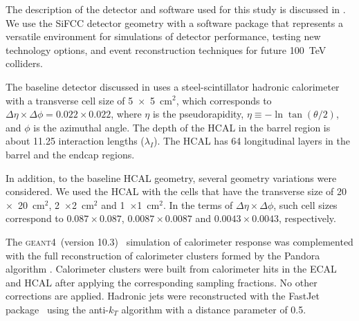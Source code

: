 \documentclass[final,1p,11pt]{elsarticle}
\newcommand{\GEANTfour} {\textsc{geant4}}
\begin{document}
The description of the detector and software used for this study is discussed in \cite{Chekanov:2016ppq}.
We use the SiFCC detector geometry with a software package that
represents a versatile environment for simulations
of detector performance, testing new technology options, and event reconstruction techniques for future
100~TeV colliders.


The baseline  detector discussed in \cite{Chekanov:2016ppq}
uses a  steel-scintillator hadronic calorimeter with a transverse cell size of 5~$\times$~5~cm$^2$,
which corresponds to $\Delta \eta \times \Delta \phi = 0.022\times0.022$,
where $\eta$ is the pseudorapidity,
$\eta \equiv -\ln\tan(\theta/2)$, and $\phi$ is the azimuthal angle.
The depth of the HCAL
in the barrel region is about 11.25 interaction lengths ($\lambda_I$).
The HCAL has 64 longitudinal layers in the barrel and the endcap regions.

In addition, to the baseline HCAL geometry,
several geometry variations were considered.
We used the HCAL with the cells that have the transverse size of
20~$\times$~20~cm$^2$, 2~$\times$2~cm$^2$ and  1~$\times$1~cm$^2$.
In the terms of $\Delta \eta \times \Delta \phi$,  such cell sizes correspond to
$0.087\times0.087$, $0.0087\times 0.0087$ and  $0.0043\times0.0043$, respectively.

The \GEANTfour\ (version 10.3)~\cite{Allison2016186} simulation of calorimeter response was complemented 
with the full reconstruction of calorimeter clusters formed by the Pandora algorithm \cite{Charles:2009ta,Marshall:2013bda}.
Calorimeter clusters were built from calorimeter hits in the  ECAL and HCAL after applying the corresponding sampling fractions.
No other corrections are applied.
Hadronic jets were 
reconstructed with the {\sc FastJet} package~\cite{fastjet} using the anti-$k_T$ algorithm \cite{Cacciari:2008gp}
with  a distance parameter of 0.5. 
\end{document}

